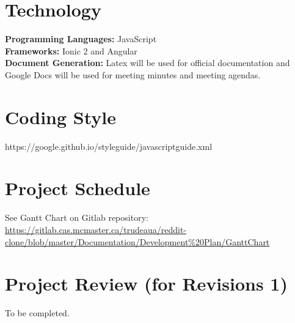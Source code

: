 \documentclass[12pt,fleqn]{article}
\begin{document}
\section {Technology}
\textbf{Programming Languages: }JavaScript \\ 
\textbf{Frameworks: }Ionic 2 and Angular \\
\textbf{Document Generation: } Latex will be used for official documentation and Google Docs will be used for meeting minutes and meeting agendas. 

\section {Coding Style}
 https://google.github.io/styleguide/javascriptguide.xml

\section {Project Schedule}
See Gantt Chart on Gitlab repository: \url{https://gitlab.cas.mcmaster.ca/trudeaua/reddit-clone/blob/master/Documentation/Development\%20Plan/GanttChart}


\section {Project Review (for Revisions 1)}
To be completed.
\end{document}
